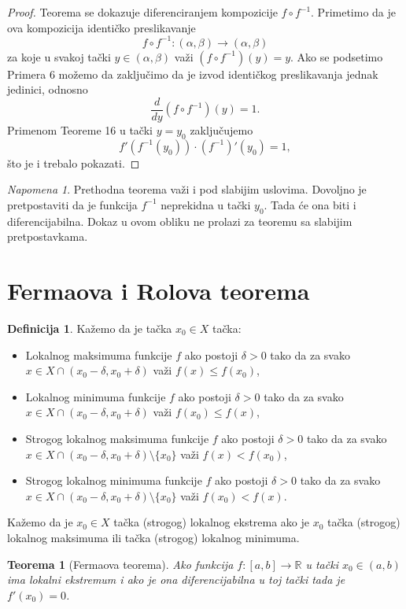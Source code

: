 \documentclass[a4paper,12pt]{article}
\theoremstyle{plain}
\newtheorem{theorem}{Teorema}[section]
\theoremstyle{definition}
\newtheorem{definition}{Definicija}[section]
\theoremstyle{remark}
\newtheorem*{remark}{Napomena}
\begin{document}
\begin{proof}
Teorema se dokazuje diferenciranjem kompozicije $f \circ f^{-1}$. Primetimo da je ova kompozicija identičko preslikavanje
$$ f \circ f^{-1} : (\alpha, \beta) \to (\alpha, \beta) $$
za koje u svakoj tački $y \in (\alpha, \beta)$ važi $(f \circ f^{-1})(y) = y$. Ako se podsetimo Primera 6 možemo da zaključimo da je izvod identičkog preslikavanja jednak jedinici, odnosno
$$ \frac{d}{dy}(f \circ f^{-1})(y) = 1. $$
Primenom Teoreme 16 u tački $y = y_0$ zaključujemo
$$ f'(f^{-1}(y_0)) \cdot (f^{-1})'(y_0) = 1, $$
što je i trebalo pokazati.
\end{proof}

\begin{remark}
Prethodna teorema važi i pod slabijim uslovima. Dovoljno je pretpostaviti da je funkcija $f^{-1}$ neprekidna u tački $y_0$. Tada će ona biti i diferencijabilna. Dokaz u ovom obliku ne prolazi za teoremu sa slabijim pretpostavkama.
\end{remark}

\section{Fermaova i Rolova teorema}
\begin{definition}
Kažemo da je tačka $x_0 \in X$ tačka:
\begin{itemize}
    \item Lokalnog maksimuma funkcije $f$ ako postoji $\delta > 0$ tako da za svako $x \in X \cap (x_0 - \delta, x_0 + \delta)$ važi $f(x) \le f(x_0)$,
    \item Lokalnog minimuma funkcije $f$ ako postoji $\delta > 0$ tako da za svako $x \in X \cap (x_0 - \delta, x_0 + \delta)$ važi $f(x_0) \le f(x)$,
    \item Strogog lokalnog maksimuma funkcije $f$ ako postoji $\delta > 0$ tako da za svako $x \in X \cap (x_0 - \delta, x_0 + \delta) \setminus \{x_0\}$ važi $f(x) < f(x_0)$,
    \item Strogog lokalnog minimuma funkcije $f$ ako postoji $\delta > 0$ tako da za svako $x \in X \cap (x_0 - \delta, x_0 + \delta) \setminus \{x_0\}$ važi $f(x_0) < f(x)$.
\end{itemize}
Kažemo da je $x_0 \in X$ tačka (strogog) lokalnog ekstrema ako je $x_0$ tačka (strogog) lokalnog maksimuma ili tačka (strogog) lokalnog minimuma.
\end{definition}

\begin{theorem}[Fermaova teorema]
Ako funkcija $f : [a, b] \to \mathbb{R}$ u tački $x_0 \in (a, b)$ ima lokalni ekstremum i ako je ona diferencijabilna u toj tački tada je $f'(x_0) = 0$.
\end{theorem}
\end{document}
